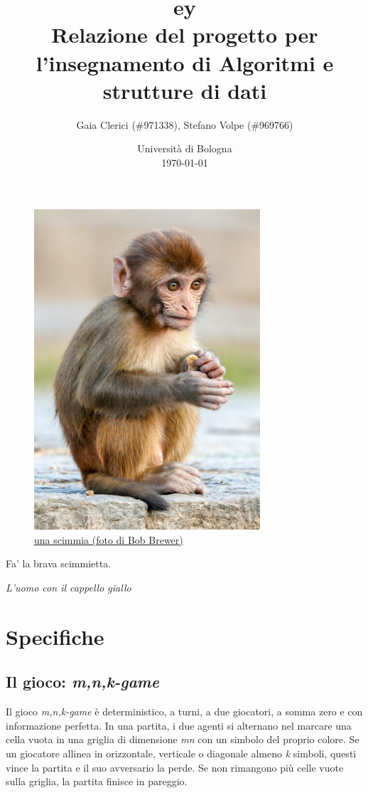\documentclass[a4paper]{article}
\title{
  {
    \fontspec[ Path = fonts/ ]{Symbola}
    \symbol{"1F17C}\symbol{"1F435}\symbol{"1F17D}\symbol{"1F17A}ey
  } \large \\
  \small Relazione del progetto per l'insegnamento di Algoritmi e strutture di
  dati
}
\author{
  Gaia Clerici (\#971338),
  Stefano Volpe (\#969766)
}
\date{
	Universit\`a di Bologna \\
  \today
}
\begin{document}
\maketitle
\thispagestyle{empty}

\begin{figure}[h]
  \includegraphics[width=0.75\textwidth]{monkey}
  \centering
  \caption{\href{https://unsplash.com/photos/daC7ji1EMHM}{una scimmia
  (foto di Bob Brewer)}}
\end{figure}

\pagebreak

\epigraph{Fa' la brava scimmietta.}{\textit{L'uomo con il cappello giallo}}

\tableofcontents

\section{Specifiche}

\subsection{Il gioco: \emph{m,n,k-game}}

Il gioco \emph{m,n,k-game} è deterministico, a turni, a due giocatori, a somma
zero e con informazione perfetta. In una partita, i due agenti si alternano nel
marcare una cella vuota in una griglia di dimensione \emph{m}\texttimes \emph{n}
con un simbolo del proprio colore. Se un giocatore allinea in orizzontale,
verticale o diagonale almeno \emph{k} simboli, questi vince la partita e il suo
avversario la perde. Se non rimangono più celle vuote sulla griglia, la partita
finisce in pareggio.
\end{document}
